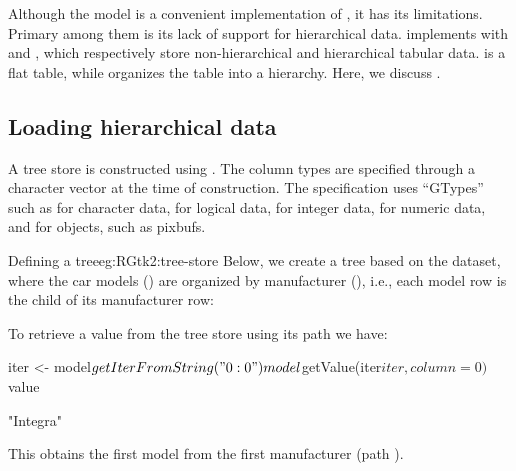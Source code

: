 Although the  model is a convenient implementation
of , it has its limitations. Primary among them is
its lack of support for hierarchical data. \GTK\/ implements
 with  and
, which respectively store non-hierarchical and
hierarchical tabular data.  is a flat table,
while  organizes the table into a hierarchy. Here,
we discuss .

\subsection{Loading hierarchical data}
  

A tree store is constructed using . The
column types are specified through a character vector at the time of
construction. The specification uses ``GTypes'' such as
 for character data,  for logical
data,  for integer data,  for numeric data,
and  for \GTK\/ objects, such as pixbufs.

\begin{example}{Defining a tree}{eg:RGtk2:tree-store}
  Below, we create a tree based on the  dataset, where
  the car models () are organized by manufacturer
  (), i.e., each model row is the child of its
  manufacturer row:
\begin{Schunk}
\end{Schunk}
  To retrieve a value from the tree store using its path we have:
\begin{Schunk}
\begin{Sinput}
 iter <- model$getIterFromString("0:0")
 model$getValue(iter$iter, column = 0)$value
\end{Sinput}
\begin{Soutput}
[1] "Integra"
\end{Soutput}
\end{Schunk}
This obtains the first model from the first manufacturer (path ).
\end{example}



